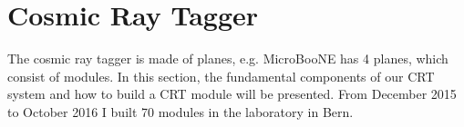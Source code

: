 \documentclass[a4paper]{article}\linespread{1.4}
\begin{document}


\clearpage
\section{Cosmic Ray Tagger}
\label{chap:crt}
The cosmic ray tagger is made of planes, e.g. MicroBooNE has 4 planes, %
which consist of modules. %
In this section, the fundamental components of our CRT system and how to build a CRT module will be presented.
From December 2015 to October 2016 I built 70 modules in the laboratory in Bern.
\end{document}
